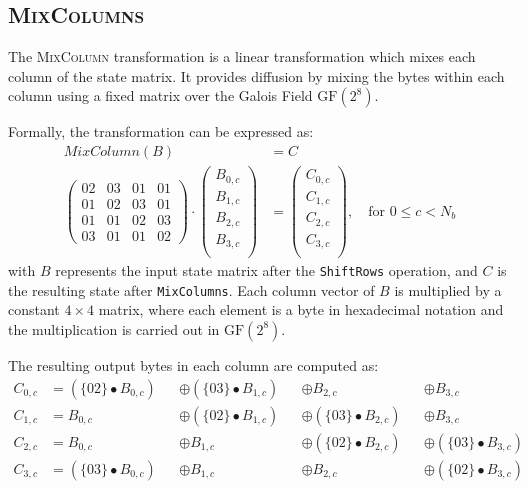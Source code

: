 \subsection{\textsc{MixColumns}}
\label{sec:MixColumns}

The \textsc{MixColumn} transformation is a linear transformation which mixes each column of the state matrix. 
It provides diffusion by mixing the bytes within each column using a fixed matrix over the Galois Field $\text{GF}(2^8)$.

Formally, the transformation can be expressed as:
\begin{align}
    MixColumn(B) &= C\\
    \begin{pmatrix}
        02 & 03 & 01 & 01\\
        01 & 02 & 03 & 01\\
        01 & 01 & 02 & 03\\
        03 & 01 & 01 & 02
    \end{pmatrix}
    \cdot
    \begin{pmatrix}
        B_{0,c} \\
        B_{1,c} \\
        B_{2,c} \\
        B_{3,c} \\
    \end{pmatrix}
    &=
    \begin{pmatrix}
        C_{0,c} \\
        C_{1,c} \\
        C_{2,c} \\
        C_{3,c} \\
    \end{pmatrix}, \quad \text{for } 0 \leq c < N_b
\end{align}
with $B$ represents the input state matrix after the \texttt{ShiftRows} operation, and $C$ is the resulting state after \texttt{MixColumns}. 
Each column vector of $B$ is multiplied by a constant $4 \times 4$ matrix, where each element is a byte in hexadecimal notation and the multiplication is carried out in $\text{GF}(2^8)$.

The resulting output bytes in each column are computed as:
\begin{align}
    C_{0,c} & = (\{02\} \bullet B_{0,c}) &&\oplus (\{03\} \bullet B_{1,c}) &&\oplus B_{2,c} &&\oplus B_{3,c}\\
    C_{1,c} & = B_{0,c} &&\oplus (\{02\} \bullet B_{1,c}) &&\oplus (\{03\} \bullet B_{2,c}) &&\oplus B_{3,c}\\
    C_{2,c} & = B_{0,c}  &&\oplus B_{1,c} &&\oplus (\{02\} \bullet B_{2,c}) &&\oplus (\{03\} \bullet B_{3,c})\\
    C_{3,c} & = (\{03\} \bullet B_{0,c}) &&\oplus B_{1,c} &&\oplus B_{2,c} &&\oplus (\{02\} \bullet B_{3,c})
\end{align}
